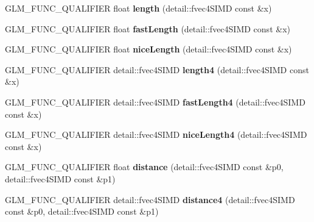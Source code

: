 \begin{DoxyCompactItemize}
\item 
G\+L\+M\+\_\+\+F\+U\+N\+C\+\_\+\+Q\+U\+A\+L\+I\+F\+I\+ER float {\bfseries length} (detail\+::fvec4\+S\+I\+MD const \&x)\hypertarget{namespaceglm_a65aff7dc68102a01ec2746d2c0c733c7}{}\label{namespaceglm_a65aff7dc68102a01ec2746d2c0c733c7}

\item 
G\+L\+M\+\_\+\+F\+U\+N\+C\+\_\+\+Q\+U\+A\+L\+I\+F\+I\+ER float {\bfseries fast\+Length} (detail\+::fvec4\+S\+I\+MD const \&x)\hypertarget{namespaceglm_ae8fababc16f402b8e518982eb08284ef}{}\label{namespaceglm_ae8fababc16f402b8e518982eb08284ef}

\item 
G\+L\+M\+\_\+\+F\+U\+N\+C\+\_\+\+Q\+U\+A\+L\+I\+F\+I\+ER float {\bfseries nice\+Length} (detail\+::fvec4\+S\+I\+MD const \&x)\hypertarget{namespaceglm_a34a9cfc7cf7fe9b35911cc3013033e61}{}\label{namespaceglm_a34a9cfc7cf7fe9b35911cc3013033e61}

\item 
G\+L\+M\+\_\+\+F\+U\+N\+C\+\_\+\+Q\+U\+A\+L\+I\+F\+I\+ER detail\+::fvec4\+S\+I\+MD {\bfseries length4} (detail\+::fvec4\+S\+I\+MD const \&x)\hypertarget{namespaceglm_a9de224e4659dd8df0f6cbfe87785ad37}{}\label{namespaceglm_a9de224e4659dd8df0f6cbfe87785ad37}

\item 
G\+L\+M\+\_\+\+F\+U\+N\+C\+\_\+\+Q\+U\+A\+L\+I\+F\+I\+ER detail\+::fvec4\+S\+I\+MD {\bfseries fast\+Length4} (detail\+::fvec4\+S\+I\+MD const \&x)\hypertarget{namespaceglm_a07438f3a62641a379456e932dd97b090}{}\label{namespaceglm_a07438f3a62641a379456e932dd97b090}

\item 
G\+L\+M\+\_\+\+F\+U\+N\+C\+\_\+\+Q\+U\+A\+L\+I\+F\+I\+ER detail\+::fvec4\+S\+I\+MD {\bfseries nice\+Length4} (detail\+::fvec4\+S\+I\+MD const \&x)\hypertarget{namespaceglm_a8279db21d38cadc5efaa0c8efababb1b}{}\label{namespaceglm_a8279db21d38cadc5efaa0c8efababb1b}

\item 
G\+L\+M\+\_\+\+F\+U\+N\+C\+\_\+\+Q\+U\+A\+L\+I\+F\+I\+ER float {\bfseries distance} (detail\+::fvec4\+S\+I\+MD const \&p0, detail\+::fvec4\+S\+I\+MD const \&p1)\hypertarget{namespaceglm_ae716903872179576658f5eb6e2632558}{}\label{namespaceglm_ae716903872179576658f5eb6e2632558}

\item 
G\+L\+M\+\_\+\+F\+U\+N\+C\+\_\+\+Q\+U\+A\+L\+I\+F\+I\+ER detail\+::fvec4\+S\+I\+MD {\bfseries distance4} (detail\+::fvec4\+S\+I\+MD const \&p0, detail\+::fvec4\+S\+I\+MD const \&p1)\hypertarget{namespaceglm_a5256e6d2d2a82b810f92fc02f64819fb}{}\label{namespaceglm_a5256e6d2d2a82b810f92fc02f64819fb}


\end{DoxyCompactItemize}
